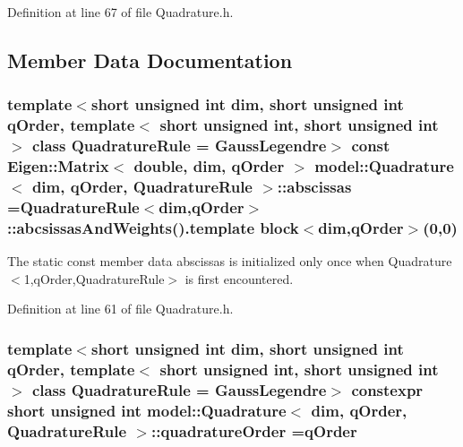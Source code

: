 Definition at line 67 of file Quadrature.\+h.



\subsection{Member Data Documentation}
\hypertarget{structmodel_1_1_quadrature_a39bde8b8646999b05a493eedc7202299}{}
\subsubsection[{abscissas}]{\setlength{\rightskip}{0pt plus 5cm}template$<$short unsigned int dim, short unsigned int q\+Order, template$<$ short unsigned int, short unsigned int $>$ class Quadrature\+Rule = Gauss\+Legendre$>$ const Eigen\+::\+Matrix$<$ double, {\bf dim}, q\+Order $>$ {\bf model\+::\+Quadrature}$<$ {\bf dim}, q\+Order, Quadrature\+Rule $>$\+::abscissas =Quadrature\+Rule$<${\bf dim},q\+Order$>$\+::abcsissas\+And\+Weights().template block$<${\bf dim},q\+Order$>$(0,0)\hspace{0.3cm}{\ttfamily [static]}}\label{structmodel_1_1_quadrature_a39bde8b8646999b05a493eedc7202299}


The static const member data abscissas is initialized only once when Quadrature$<$1,q\+Order,\+Quadrature\+Rule$>$ is first encountered. 



Definition at line 61 of file Quadrature.\+h.

\hypertarget{structmodel_1_1_quadrature_a9cd62ae38e0cc707065ff7b1f57785da}{}
\subsubsection[{quadrature\+Order}]{\setlength{\rightskip}{0pt plus 5cm}template$<$short unsigned int dim, short unsigned int q\+Order, template$<$ short unsigned int, short unsigned int $>$ class Quadrature\+Rule = Gauss\+Legendre$>$ constexpr short unsigned int {\bf model\+::\+Quadrature}$<$ {\bf dim}, q\+Order, Quadrature\+Rule $>$\+::quadrature\+Order =q\+Order\hspace{0.3cm}{\ttfamily [static]}}\label{structmodel_1_1_quadrature_a9cd62ae38e0cc707065ff7b1f57785da}


